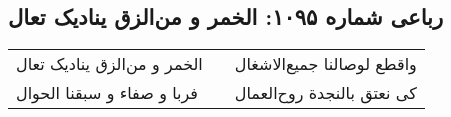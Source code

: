 \begin{center}
\section*{رباعی شماره ۱۰۹۵: الخمر و من‌الزق ینادیک تعال}
\label{sec:1095}
\begin{longtable}{l p{0.5cm} r}
الخمر و من‌الزق ینادیک تعال
&&
واقطع لوصالنا جمیع‌الاشغال
\\
فربا و صفاء و سبقنا الحوال
&&
کی نعتق بالنجدة روح‌العمال
\\
\end{longtable}
\end{center}
